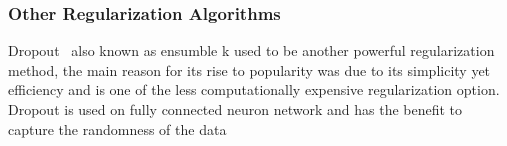 \subsubsection{Other Regularization Algorithms}

Dropout~\cite{JMLR:v15:srivastava14a} also known as ensumble k used to be another powerful regularization method, the main reason for its rise to popularity was due to its simplicity yet efficiency and is one of the less computationally expensive regularization option. Dropout is used on fully connected neuron network and has the benefit to capture the randomness of the data